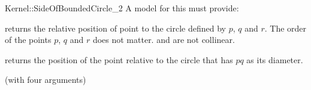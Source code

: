 \begin{ccRefFunctionObjectConcept}{Kernel::SideOfBoundedCircle_2}
A model for this must provide:


         {returns the relative position of point 
          to the circle defined by $p$, $q$ and $r$. The order
          of the points $p$, $q$ and $r$ does not matter.
          \ccPrecond {} and  are not collinear.}

         {returns the position of the point  relative to the circle
          that has $pq$ as its diameter.}

\ccRefines
{} (with four arguments)

\ccSeeAlso
{} \\

\end{ccRefFunctionObjectConcept}
